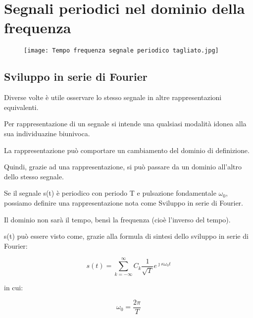\chapter{Segnali periodici nel dominio della frequenza}

\begin{figure}[h]
    \centering
    \texttt{[image: Tempo frequenza segnale periodico tagliato.jpg]}
\end{figure}  

\newpage 

\section{Sviluppo in serie di Fourier}

Diverse volte è utile osservare lo stesso segnale in altre rappresentazioni equivalenti. \newline 

Per rappresentazione di un segnale si intende una qualsiasi modalità idonea alla sua individuazine 
biunivoca. \newline 

La rappresentazione può comportare un cambiamento del dominio di definizione. \newline  

Quindi, grazie ad una rappresentazione, si può passare da un dominio all'altro dello stesso segnale. \newline 

Se il segnale s(t) è periodico con periodo T e pulsazione fondamentale $\omega_0$, possiamo definire una rappresentazione 
nota come Sviluppo in serie di Fourier. \newline 

Il dominio non sarà il tempo, bensì la frequenza (cioè l'inverso del tempo). \newline 

s(t) può essere visto come, grazie alla formula di sintesi dello sviluppo in serie di Fourier: \newline

{
    \Large 
    \begin{equation}
        s(t) 
        = 
        \sum_{k = - \infty}^{\infty} 
        C_k \frac{1}{\sqrt{T}} e^{\jmath \kappa \omega_0 t}
    \end{equation}
}

in cui: \newline

{
    \Large 
    \begin{equation}
        \omega_0 = \frac{2 \pi}{T}
    \end{equation}
}

